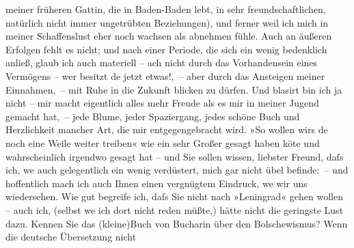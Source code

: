 \begin{ledgroupsized}[t]{13cm}
               meiner früheren Gattin, die in
                  Baden-Baden lebt, in sehr freundschaftlichen,
               natürlich nicht immer unge{\pb}trübten Beziehungen),
               und ferner weil ich mich in meiner Schaffenslust eher noch wachsen als abnehmen
               fühle. Auch an äußeren Erfolgen fehlt es nicht; und nach einer Periode, die sich ein
               wenig bedenklich anließ, glaub ich auch materiell – ach nicht durch das Vorhandensein
               eines Vermögens – wer besitzt de{\geminationn} jetzt etwas!, – aber
               durch das Ansteigen meiner Einnahmen, – mit Ruhe in die Zukunft blicken zu dürfen.
               Und blasirt bin ich ja nicht – mir macht eigentlich alles mehr Freude als es mir in
               meiner Jugend gemacht hat, – jede Blume, jeder Spaziergang, jedes schöne Buch und
               Herzlichkeit mancher Art, die mir entgegengebracht wird. »So wollen wirs de{\geminationn} noch eine Weile weiter treiben« wie ein sehr Großer
               gesagt haben kö{\geminationn}te und wahrscheinlich irgendwo gesagt
               hat – und Sie sollen wissen, liebster Freund, daſs ich, we{\geminationn} auch gelegentlich ein wenig verdüstert, {\pb}mich gar nicht übel befinde; – und hoffentlich
               mach ich auch Ihnen einen vergnügtem Eindruck, we{\geminationn} wir
               uns wiedersehen.\pend
           \pstart
           Wie gut begreife ich, daſs Sie nicht nach »Leningrad« gehen wollen – auch ich, (selbst we{\geminationn}
               ich dort nicht reden müßte,) hätte nicht die geringste Lust dazu. Kennen Sie das \introOben{}(kleine)\introOben{}{ }Buch von Bucharin über den Bolschewismus? Wenn die deutsche Übersetzung
               nicht \label{T_L02444_2v}
\end{ledgroupsized}
